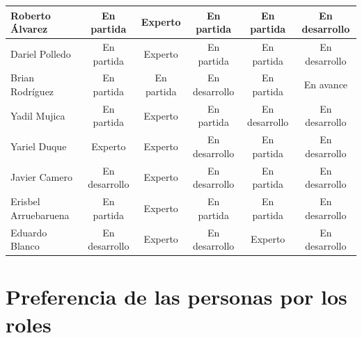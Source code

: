 {\begin{table}[H]
{\begin{tabular}{ p{2.6cm} c c c c c }
			Roberto Álvarez                       & En partida    & Experto    & En partida    & En partida    & En desarrollo \\ \hline
			Dariel Polledo                        & En partida    & Experto    & En partida    & En partida    & En desarrollo \\ \hline
			Brian Rodríguez                       & En partida    & En partida & En desarrollo & En partida    & En avance     \\ \hline
			Yadil Mujica                          & En partida    & Experto    & En partida    & En desarrollo & En desarrollo \\ \hline
			Yariel Duque                          & Experto       & Experto    & En desarrollo & En partida    & En desarrollo \\ \hline
			Javier Camero                         & En desarrollo & Experto    & En desarrollo & En partida    & En desarrollo \\ \hline
			Erisbel Arruebaruena                  & En partida    & Experto    & En partida    & En partida    & En desarrollo \\ \hline
			Eduardo Blanco                        & En desarrollo & Experto    & En desarrollo & Experto       & En desarrollo \\ \bottomrule
		\end{tabular}
	}
\end{table}



\chapter{Preferencia de las personas por los roles}

}

